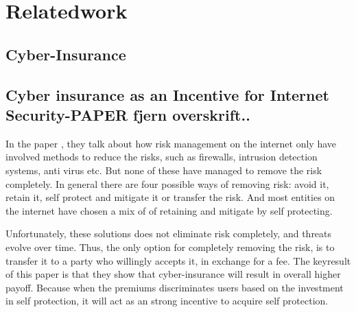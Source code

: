 \chapter{Relatedwork}
\label{chp:relatedwork} 



\section{Cyber-Insurance}


\section{Cyber insurance as an Incentive for Internet Security-PAPER fjern overskrift..}
In the paper \cite{bolot2008cyber}, they talk about how risk management on the internet only have involved methods to reduce the risks, such as firewalls, intrusion detection systems, anti virus etc. But none of these have managed to remove the risk completely. In general there are four possible ways of removing risk: avoid it, retain it, self protect and mitigate it or transfer the risk. And most entities on the internet have chosen a mix of of retaining and mitigate by self protecting. 

Unfortunately, these solutions does not eliminate risk completely, and threats evolve over time. Thus, the only option for completely removing the risk, is to transfer it to a party who willingly accepts it, in exchange for a fee. The keyresult of this paper is that they show that cyber-insurance will result in overall higher payoff. Because when the premiums discriminates users based on the investment in self protection, it will act as an strong incentive to acquire self protection. 


